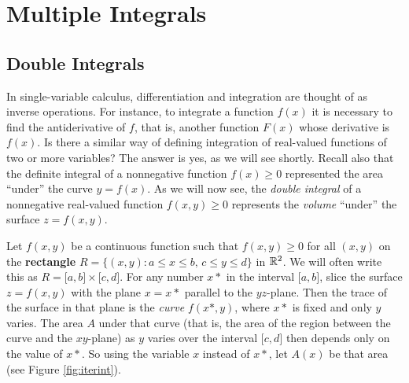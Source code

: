 \chapter{Multiple Integrals}
\label{chapter:mult-integrals}
\section{Double Integrals}
In single-variable calculus, differentiation and integration are thought of as inverse operations. For instance, to
integrate a function $f(x)$ it is necessary to find the antiderivative of $f$, that is, another function $F(x)$
whose derivative is $f(x)$. Is there a similar way of defining integration of real-valued functions of two or
more variables? The answer is yes, as we will see shortly. Recall also that the definite integral of a
nonnegative function $f(x) \ge 0$ represented the area ``under'' the curve $y=f(x)$. As we will now see, the
\emph{double integral} of a nonnegative real-valued function $f(x,y) \ge 0$ represents the \emph{volume} ``under'' the
surface $z=f(x,y)$.

Let $f(x,y)$ be a continuous function such that $f(x,y) \ge 0$ for all $(x,y)$ on the \textbf{rectangle}
$R = \lbrace (x,y): a \le x \le b ,\, c \le y \le d \rbrace$ in $\mathbb{R}^{2}$. We will often write this as
$R = \lbrack a,b \rbrack \times \lbrack c,d \rbrack$. For any number $x*$ in the interval $\lbrack a,b \rbrack$, slice
the surface $z=f(x,y)$ with the plane $x=x*$ parallel to the $yz$-plane.
Then the trace of the surface in that plane is the \emph{curve} $f(x*,y)$, where $x*$ is fixed and only $y$
varies. 
The area $A$ under that curve 
(that is, the area of the region between the curve and the $xy$-plane)
as $y$ varies over the interval $\lbrack c,d \rbrack$ then depends only on the value of $x*$. So using the variable $x$ instead of
$x*$, let $A(x)$ be that area (see Figure \ref{fig:iterint}).

